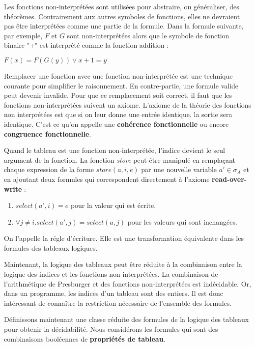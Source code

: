 \documentclass[11pt,openany]{article}
\begin{document}
	Les fonctions non-interpr\'et\'ees sont utilis\'ees pour abstraire, ou g\'en\'eraliser, des th\'eor\`emes. Contrairement aux autres symboles de fonctions, elles ne devraient pas \^etre interpr\'et\'ees comme une partie de la formule. Dans la formule suivante, par exemple, $F$ et $G$ sont non-interpr\'et\'ees alors que le symbole de fonction binaire "+" est interpr\'et\'e comme la fonction addition :
	
	
$F(x) = F(G(y)) \lor x+1=y$

Remplacer une fonction avec une fonction non-interpr\'et\'ee est une technique courante pour simplifier le raisonnement.	En contre-partie, une formule valide peut devenir invalide. Pour que ce remplacement soit correct, il faut que les fonctions non-interpr\'et\'ees suivent un axiome. L'axiome de la th\'eorie des fonctions non interpr\'et\'ees est que si on leur donne une entr\'ee identique, la sortie sera identique. C'est ce qu'on appelle une \textbf{coh\'erence fonctionnelle} ou encore \textbf{congruence fonctionnelle}.

Quand le tableau est une fonction non-interpr\'et\'ee, l'indice devient le seul argument de la fonction. La fonction \textit{store} peut \^etre manipul\'e en rempla\c{c}ant chaque expression de la forme $store(a,i,e)$ par une nouvelle variable $a'\in \sigma_A$ et en ajoutant deux formules qui correspondent directement \`a l'axiome \textbf{read-over-write} :

\begin{enumerate}
\item $select(a',i)=e$ pour la valeur qui est \'ecrite,
\item $\forall j\neq i. select(a',j)=select(a,j)$ pour les valeurs qui sont inchang\'ees.
\end{enumerate}	
	
On l'appelle la r\'egle d'\'ecriture. Elle est une transformation \'equivalente dans les formules des tableaux logiques.

Maintenant, la logique des tableaux peut \^etre r\'eduite \`a la combinaison entre la logique des indices et les fonctions non-interpr\'et\'ees. La combinaison de l'arithm\'etique de Presburger et des fonctions non-interpr\'et\'ees est ind\'ecidable. Or, dans un programme, les indices d'un tableau sont des entiers. Il est donc int\'eressant de conna\^itre la restriction n\'ecessaire de l'ensemble des formules.

	
	D\'efinissons maintenant une classe r\'eduite des formules de la logique des tableaux pour obtenir la d\'ecidabilit\'e. Nous consid\'erons les formules qui sont des combinaisons bool\'eennes de \textbf{propri\'et\'es de tableau}.
	
\end{document}
